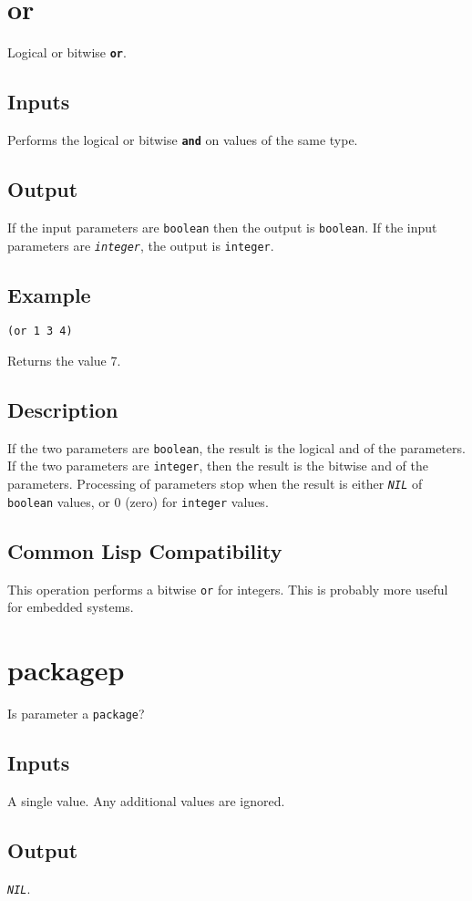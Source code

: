 \documentclass[10pt, openany]{book}
\newcommand{\operation}[1]{\textbf{\texttt{#1}}}
\newcommand{\constant}[1]{\emph{\texttt{#1}}}
\newcommand{\keyword}[1]{\texttt{#1}}
\newcommand{\datatype}[1]{\texttt{#1}}
\begin{document}
\section{or}
Logical or bitwise \operation{or}.
\subsection{Inputs}
Performs the logical or bitwise \operation{and} on values of the same type.
\subsection{Output}
If the input parameters are \datatype{boolean} then the output is \datatype{boolean}.  If the input parameters are \constant{integer}, the output is \datatype{integer}.
\subsection{Example}
\begin{lstlisting}
(or 1 3 4)
\end{lstlisting}
Returns the value 7.
\subsection{Description}
If the two parameters are \datatype{boolean}, the result is the logical and of the parameters.  If the two parameters are \datatype{integer}, then the result is the bitwise and of the parameters.  Processing of parameters stop when the result is either \constant{NIL} of \datatype{boolean} values, or 0 (zero) for \datatype{integer} values.
\subsection{Common Lisp Compatibility}
This operation performs a bitwise \keyword{or} for integers.  This is probably more useful for embedded systems.

\section{packagep}
Is parameter a \datatype{package}?
\subsection{Inputs}
A single value.  Any additional values are ignored.
\subsection{Output}
\constant{NIL}.
\end{document}
